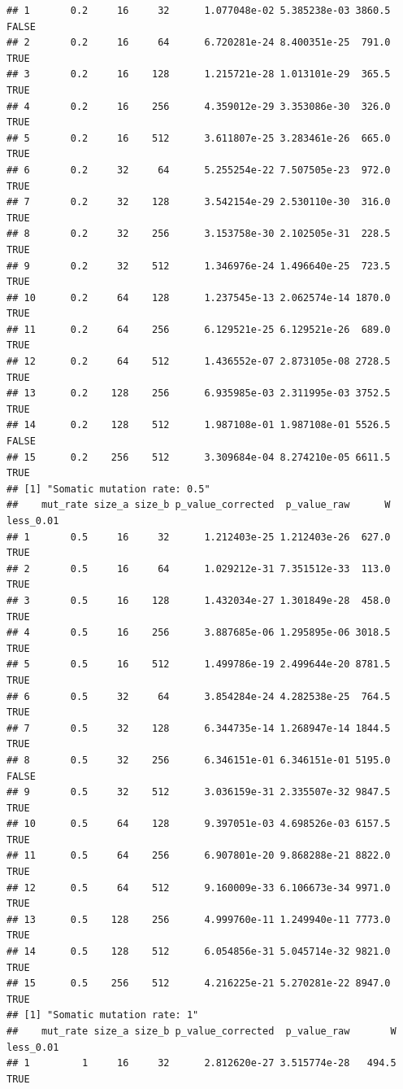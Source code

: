 \documentclass[
]{book}
\begin{document}
\begin{verbatim}
## 1       0.2     16     32      1.077048e-02 5.385238e-03 3860.5     FALSE
## 2       0.2     16     64      6.720281e-24 8.400351e-25  791.0      TRUE
## 3       0.2     16    128      1.215721e-28 1.013101e-29  365.5      TRUE
## 4       0.2     16    256      4.359012e-29 3.353086e-30  326.0      TRUE
## 5       0.2     16    512      3.611807e-25 3.283461e-26  665.0      TRUE
## 6       0.2     32     64      5.255254e-22 7.507505e-23  972.0      TRUE
## 7       0.2     32    128      3.542154e-29 2.530110e-30  316.0      TRUE
## 8       0.2     32    256      3.153758e-30 2.102505e-31  228.5      TRUE
## 9       0.2     32    512      1.346976e-24 1.496640e-25  723.5      TRUE
## 10      0.2     64    128      1.237545e-13 2.062574e-14 1870.0      TRUE
## 11      0.2     64    256      6.129521e-25 6.129521e-26  689.0      TRUE
## 12      0.2     64    512      1.436552e-07 2.873105e-08 2728.5      TRUE
## 13      0.2    128    256      6.935985e-03 2.311995e-03 3752.5      TRUE
## 14      0.2    128    512      1.987108e-01 1.987108e-01 5526.5     FALSE
## 15      0.2    256    512      3.309684e-04 8.274210e-05 6611.5      TRUE
## [1] "Somatic mutation rate: 0.5"
##    mut_rate size_a size_b p_value_corrected  p_value_raw      W less_0.01
## 1       0.5     16     32      1.212403e-25 1.212403e-26  627.0      TRUE
## 2       0.5     16     64      1.029212e-31 7.351512e-33  113.0      TRUE
## 3       0.5     16    128      1.432034e-27 1.301849e-28  458.0      TRUE
## 4       0.5     16    256      3.887685e-06 1.295895e-06 3018.5      TRUE
## 5       0.5     16    512      1.499786e-19 2.499644e-20 8781.5      TRUE
## 6       0.5     32     64      3.854284e-24 4.282538e-25  764.5      TRUE
## 7       0.5     32    128      6.344735e-14 1.268947e-14 1844.5      TRUE
## 8       0.5     32    256      6.346151e-01 6.346151e-01 5195.0     FALSE
## 9       0.5     32    512      3.036159e-31 2.335507e-32 9847.5      TRUE
## 10      0.5     64    128      9.397051e-03 4.698526e-03 6157.5      TRUE
## 11      0.5     64    256      6.907801e-20 9.868288e-21 8822.0      TRUE
## 12      0.5     64    512      9.160009e-33 6.106673e-34 9971.0      TRUE
## 13      0.5    128    256      4.999760e-11 1.249940e-11 7773.0      TRUE
## 14      0.5    128    512      6.054856e-31 5.045714e-32 9821.0      TRUE
## 15      0.5    256    512      4.216225e-21 5.270281e-22 8947.0      TRUE
## [1] "Somatic mutation rate: 1"
##    mut_rate size_a size_b p_value_corrected  p_value_raw       W less_0.01
## 1         1     16     32      2.812620e-27 3.515774e-28   494.5      TRUE

\end{verbatim}
\end{document}
